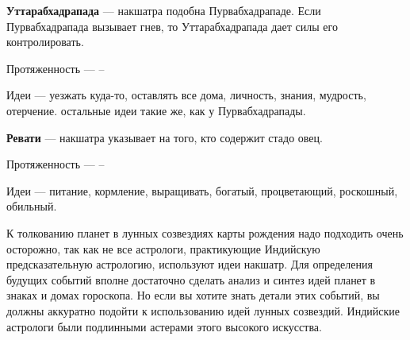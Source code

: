 \begin{myenum}
\begin{mydescr}
		\end{mydescr}
	\item \textbf{Уттарабхадрапада} --- накшатра подобна Пурвабхадрападе. Если Пурвабхадрапада вызывает гнев, то Уттарабхадрапада дает силы его контролировать.
		\begin{mydescr}
			\item[Протяженность] ---  -- 
			\item[Идеи] --- уезжать куда-то, оставлять все дома, личность, знания, мудрость, отерчение. остальные идеи такие же, как у Пурвабхадрапады.
		\end{mydescr}
	\item \textbf{Ревати} --- накшатра указывает на того, кто содержит стадо овец.
		\begin{mydescr}
			\item[Протяженность] ---  -- \signum{0}{}{\apies}
			\item[Идеи] --- питание, кормление, выращивать, богатый, процветающий, роскошный, обильный.
		\end{mydescr}
\end{myenum}

К толкованию планет в лунных созвездиях карты рождения надо подходить очень осторожно, так как не все астрологи, практикующие Индийскую предсказательную астрологию, используют идеи накшатр. Для определения будущих событий вполне достаточно сделать анализ и синтез идей планет в знаках и домах гороскопа. Но если вы хотите знать детали этих событий, вы должны аккуратно подойти к использованию идей лунных созвездий. Индийские астрологи были подлинными астерами этого высокого искусства.
